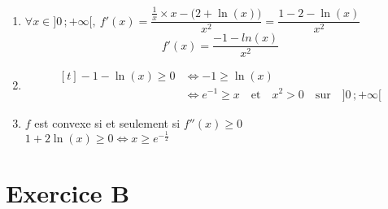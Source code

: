 \documentclass{scrartcl}
\begin{document}
\begin{adjustwidth}{2em}{0pt}
\begin{enumerate}
            \item   $\forall x\in\big]0\,;+\infty\big[,\ f'(x)=\dfrac{\tfrac{1}{x}\times x-\big(2+\ln(x)\big)}{x^2}=\dfrac{1-2-\ln(x)}{x^2}$ \[\boxed{f'(x)=\frac{-1-ln(x)}{x^2}}\]
                    \pagebreak
            \item   \[\begin{aligned}[t]
                        -1-\ln(x)\geq 0&\iff-1\geq\ln(x) \\
                        &\iff e^{-1}\geq x\quad\text{et}\quad x^2>0\quad\text{sur}\quad\big]0\,;+\infty\big[
                    \end{aligned}\]\vspace{1em}
                    \begin{center}\end{center}
                    \parbox{\linewidth}{}

            \item   $f$ est convexe si et seulement si $f''(x)\geq 0$ \\ $1+2\ln(x)\geq 0\iff x\geq e^{-\frac{1}{2}}$ \par \fbox{$f$ convexe sur $\big[e^{-\frac{1}{2}}\,;+\infty\big[$}
        \end{enumerate}
    \end{adjustwidth}
    \section*{Exercice B}
\end{document}

